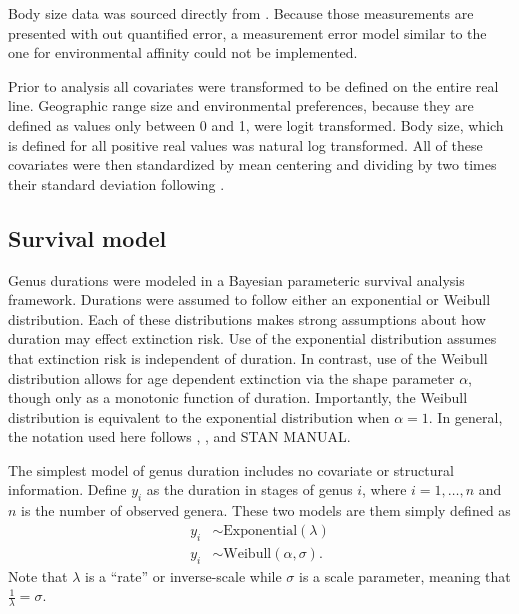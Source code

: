 \documentclass[12pt,letterpaper]{article}
\begin{document}
Body size data was sourced directly from \citet{Payne2014}. Because those measurements are presented with out quantified error, a measurement error model similar to the one for environmental affinity could not be implemented.

Prior to analysis all covariates were transformed to be defined on the entire real line. Geographic range size and environmental preferences, because they are defined as values only between 0 and 1, were logit transformed. Body size, which is defined for all positive real values was natural log transformed. All of these covariates were then standardized by mean centering and dividing by two times their standard deviation following \citet{Gelman2007}.


\subsection{Survival model}

Genus durations were modeled in a Bayesian parameteric survival analysis framework. Durations were assumed to follow either an exponential or Weibull distribution. Each of these distributions makes strong assumptions about how duration may effect extinction risk. Use of the exponential distribution assumes that extinction risk is independent of duration. In contrast, use of the Weibull distribution allows for age dependent extinction via the shape parameter \(\alpha\), though only as a monotonic function of duration. Importantly, the Weibull distribution is equivalent to the exponential distribution when \(\alpha = 1\). In general, the notation used here follows \citet{Gelman2007}, \citet{Gelman2013d}, and \uppercase{stan manual}.

The simplest model of genus duration includes no covariate or structural information. Define \(y_{i}\) as the duration in stages of genus \(i\), where \(i = 1, \dots, n\) and \(n\) is the number of observed genera. These two models are them simply defined as
\begin{equation}
  \begin{aligned}
    y_{i} &\sim \mathrm{Exponential}(\lambda) \\
    y_{i} &\sim \mathrm{Weibull}(\alpha, \sigma).
  \end{aligned}
  \label{eq:simple}
\end{equation}
Note that \(\lambda\) is a ``rate'' or inverse-scale while \(\sigma\) is a scale parameter, meaning that \(\frac{1}{\lambda} = \sigma\).
\end{document}
